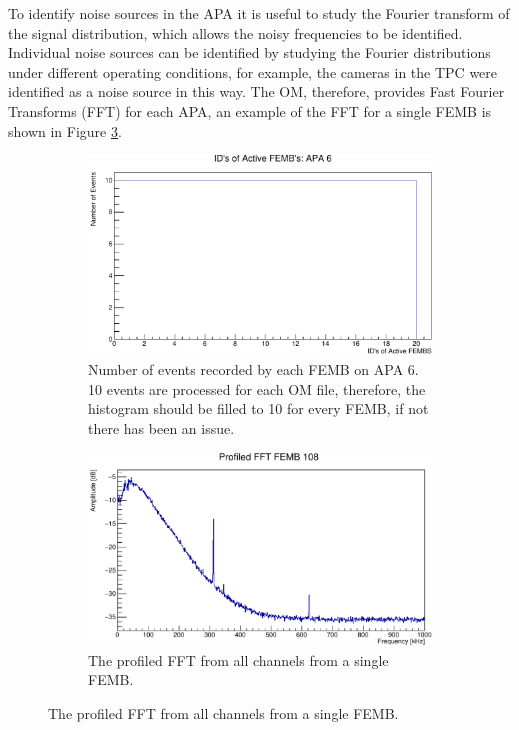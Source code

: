 To identify noise sources in the APA it is useful to study the Fourier transform
of the signal distribution, which allows the noisy frequencies to be identified.
Individual noise sources can be identified by studying the Fourier 
distributions under different operating conditions, for example, the cameras 
in the TPC were identified as a noise source in this way. The OM, therefore, 
provides Fast Fourier Transforms (FFT) for each APA, an example of the FFT for 
a single FEMB is shown in Figure \ref{fig:TPC_FFT}.

\begin{figure}

	\centering

	\begin{subfigure}[b]{0.75\textwidth}
		\centering
		\includegraphics[width=\textwidth]{figures/active_femb.pdf}
		\caption {Number of events recorded by each FEMB on APA 6. 10 events are
		processed for each OM file, therefore, the histogram should be filled to 10
		for every FEMB, if not there has been an issue.}
		\label{fig:active_femb}
	\end{subfigure}

	\begin{subfigure}[b]{0.75\textwidth}
		\centering
		\vspace{3mm}
		\includegraphics[width=\textwidth]{figures/tpc_fft.pdf}
		\caption {The profiled FFT from all channels from a single FEMB.}
		\label{fig:TPC_FFT}
	\end{subfigure}


\end{figure}
